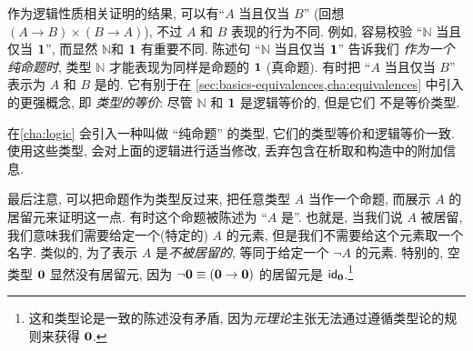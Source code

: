 作为逻辑性质相关证明的结果, 可以有``$A$ 当且仅当 $B$'' (回想 $(A\to B)\times (B\to A)$), 不过 $A$ 和 $B$ 表现的行为不同. 例如, 容易校验 ``$\mathbb{N}$ 当且仅当 $\unit$'', 而显然 $\mathbb{N}$和 $\unit$ 有重要不同. 陈述句 ``$\mathbb{N}$ 当且仅当 $\unit$'' 告诉我们 \emph{作为一个纯命题时}, 类型 $\mathbb{N}$ 才能表现为同样是命题的 $\unit$ (真命题). 有时把 ``$A$ 当且仅当 $B$'' 表示为 $A$ 和 $B$ 是的. %
%
它有别于在  \cref{sec:basics-equivalences,cha:equivalences} 中引入的更强概念, 即 \emph{类型的等价}: 尽管 $\mathbb{N}$ 和 $\unit$ 是逻辑等价的, 但是它们 不是等价类型. 

在\cref{cha:logic} 会引入一种叫做 ``纯命题'' 的类型, 它们的类型等价和逻辑等价一致. 使用这些类型, 会对上面的逻辑进行适当修改,  丢弃包含在析取和构造中的附加信息. 

最后注意, 可以把命题作为类型反过来, 把任意类型 $A$ 当作一个命题, 而展示 $A$ 的居留元来证明这一点. 有时这个命题被陈述为 ``$A$ 是''. %
%
也就是, 当我们说 $A$ 被居留, 我们意味我们需要给定一个(特定的) $A$ 的元素, 但是我们不需要给这个元素取一个名字. 类似的, 为了表示 $A$ 是\emph{不被居留的}, 等同于给定一个 $\neg A$ 的元素. 特别的, 空类型 $\emptyt$ 显然没有居留元, 因为 $\neg \emptyt \jdeq (\emptyt \to \emptyt)$ 的居留元是 $\idfunc[\emptyt]$.\footnote{这和类型论是一致的陈述没有矛盾, 因为\emph{元理论}主张无法通过遵循类型论的规则来获得 $\emptyt$.} 

%
%
%